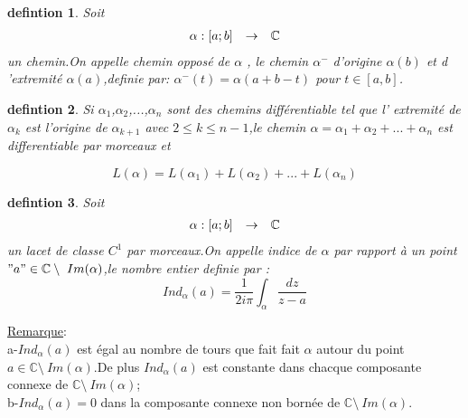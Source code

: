 \documentclass[a4paper,12pt]{book}
\newtheorem{definition}{defintion}[section]
\begin{document}
\begin{definition}
Soit \[
          \begin{array}{r c l}
          	\alpha :[a;b] & \to & \mathbb{C}\\
          \end{array}
\]un chemin.On appelle chemin opposé de $\alpha$ , le chemin
$\alpha^-$ d'origine $\alpha(b)$ et d 'extremité $\alpha(a)$,definie par:
 $\alpha^-(t) = \alpha(a+b-t)$ pour $t\in [a,b]$.\\
\end{definition}
 \begin{definition}
  Si $\alpha_1$,$\alpha_2$,...,$\alpha_n$ sont des chemins différentiable tel que l' extremité de $\alpha_k$ est l'origine de $\alpha_{k+1}$ avec $ 2\le k \le n-1$,le chemin
 $\alpha=\alpha_1 + \alpha_2 +...+ \alpha_n$ est differentiable par morceaux et 

        $$L(\alpha)= L(\alpha_1)+ L(\alpha_2)+...+ L(\alpha_n) $$
        \centering
\end{definition}
\begin{definition}
	Soit \[
	\begin{array}{r c l}
		\alpha:[a;b] & \to & \mathbb{C}\\
	\end{array}
	\]
	un lacet de classe $ C^1$ par morceaux.On appelle indice de $\alpha$ par rapport à un point $"a" \in \mathbb{C}\setminus\ Im(\alpha)$,le nombre entier definie par :
	    $$Ind_\alpha (a) = \frac{1}{2i\pi}\int_{\alpha}\frac{dz}{z-a}$$
\end{definition}
\underline{Remarque}:\\
a-$Ind_\alpha(a)$ est égal au nombre de tours que fait fait $\alpha$ autour du point $ a\in\mathbb{C}\setminus\ Im(\alpha)$.De plus $ Ind_\alpha(a)$ est constante dans chacque composante connexe de $\mathbb{C}\setminus\ Im(\alpha)$;\\b-$Ind_\alpha(a) =0 $ dans la composante connexe non bornée de $\mathbb{C}\setminus\ Im(\alpha)$.\\
\end{document}
